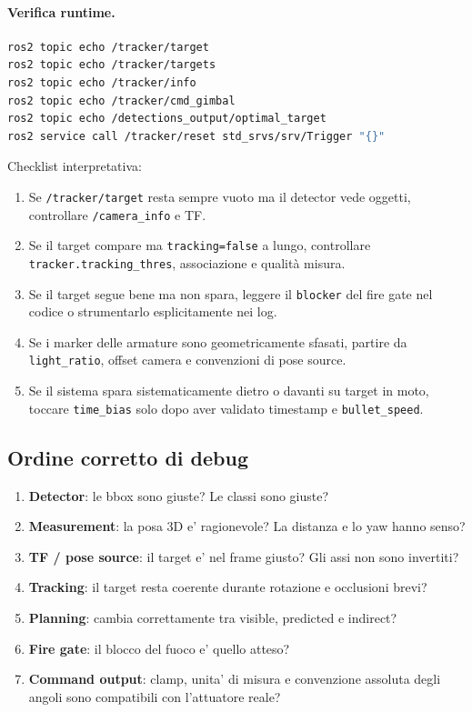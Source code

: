 \documentclass[11pt,a4paper]{article}
\newcommand{\code}[1]{\texttt{#1}}
\newcommand{\topic}[1]{\texttt{#1}}
\begin{document}
\paragraph{Verifica runtime.}
\begin{lstlisting}[style=shellstyle,language=bash,caption={Comandi minimi utili per ispezionare il runtime}]
ros2 topic echo /tracker/target
ros2 topic echo /tracker/targets
ros2 topic echo /tracker/info
ros2 topic echo /tracker/cmd_gimbal
ros2 topic echo /detections_output/optimal_target
ros2 service call /tracker/reset std_srvs/srv/Trigger "{}"
\end{lstlisting}

Checklist interpretativa:
\begin{enumerate}[leftmargin=1.4em]
  \item Se \topic{/tracker/target} resta sempre vuoto ma il detector vede oggetti, controllare \topic{/camera_info} e TF.
  \item Se il target compare ma \code{tracking=false} a lungo, controllare \code{tracker.tracking\_thres}, associazione e qualità misura.
  \item Se il target segue bene ma non spara, leggere il \code{blocker} del fire gate nel codice o strumentarlo esplicitamente nei log.
  \item Se i marker delle armature sono geometricamente sfasati, partire da \code{light\_ratio}, offset camera e convenzioni di pose source.
  \item Se il sistema spara sistematicamente dietro o davanti su target in moto, toccare \code{time\_bias} solo dopo aver validato timestamp e \code{bullet\_speed}.
\end{enumerate}

\subsection{Ordine corretto di debug}

\begin{enumerate}[leftmargin=1.4em]
  \item \textbf{Detector}: le bbox sono giuste? Le classi sono giuste?
  \item \textbf{Measurement}: la posa 3D e' ragionevole? La distanza e lo yaw hanno senso?
  \item \textbf{TF / pose source}: il target e' nel frame giusto? Gli assi non sono invertiti?
  \item \textbf{Tracking}: il target resta coerente durante rotazione e occlusioni brevi?
  \item \textbf{Planning}: cambia correttamente tra visible, predicted e indirect?
  \item \textbf{Fire gate}: il blocco del fuoco e' quello atteso?
  \item \textbf{Command output}: clamp, unita' di misura e convenzione assoluta degli angoli sono compatibili con l'attuatore reale?
\end{enumerate}
\end{document}
